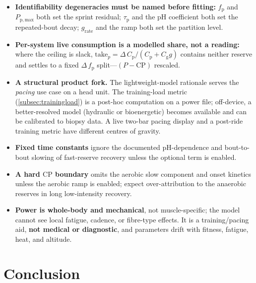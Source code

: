 \documentclass[11pt,a4paper]{article}
\newcommand{\CP}{\ensuremath{\mathrm{CP}}}
\newcommand{\fp}{\ensuremath{f_{\mathrm p}}}
\newcommand{\Cp}{\ensuremath{C_{\mathrm p}}}
\newcommand{\Cg}{\ensuremath{C_{\mathrm g}}}
\newcommand{\Ppmax}{\ensuremath{P_{\mathrm{p,max}}}}
\newcommand{\grate}{\ensuremath{g_{\mathrm{rate}}}}
\newcommand{\taup}{\ensuremath{\tau_{\mathrm p}}}
\begin{document}
\begin{itemize}[leftmargin=1.4em,itemsep=3pt]
slightly full). Its late-effort recurrence is driven by the fullness taper collapsing the flux ceiling
below what a deep-but-still-sprinting rider produces---structural, not a settings error; $D$ should be
reported and the per-system split refused when $D$ is a large fraction of total.
\item \textbf{Identifiability degeneracies must be named before fitting:} \fp{} and \Ppmax{} both set the
sprint residual; \taup{} and the pH coefficient both set the repeated-bout decay; \grate{} and the ramp
both set the partition level.
\item \textbf{Per-system live consumption is a modelled share, not a reading:} where the ceiling is slack,
$\mathrm{take}_p = \Delta\,\Cp/(\Cp+\Cg g)$ contains neither reserve and settles to a fixed $\Delta\,\fp$
split---$(P-\CP)$ rescaled.
\item \textbf{A structural product fork.} The lightweight-model rationale serves the \emph{pacing} use
case on a head unit. The training-load metric (\cref{subsec:trainingload}) is a post-hoc computation on a
power file; off-device, a better-resolved model (hydraulic or bioenergetic) becomes available and can be
calibrated to biopsy data. A live two-bar pacing display and a post-ride training metric have different
centres of gravity.
\item \textbf{Fixed time constants} ignore the documented pH-dependence and bout-to-bout slowing of
fast-reserve recovery unless the optional term is enabled.
\item \textbf{A hard \CP{} boundary} omits the aerobic slow component and onset kinetics unless the aerobic
ramp is enabled; expect over-attribution to the anaerobic reserves in long low-intensity recovery.
\item \textbf{Power is whole-body and mechanical}, not muscle-specific; the model cannot see local fatigue,
cadence, or fibre-type effects. It is a training/pacing aid, \textbf{not medical or diagnostic}, and
parameters drift with fitness, fatigue, heat, and altitude.
\end{itemize}

\section{Conclusion}\label{sec:conclusion}
\end{document}
